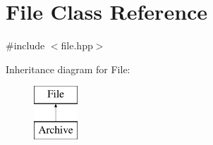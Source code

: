 \hypertarget{class_file}{\section{File Class Reference}
\label{class_file}
}


{\ttfamily \#include $<$file.\-hpp$>$}

Inheritance diagram for File\-:\begin{figure}[H]
\begin{center}
\leavevmode
\includegraphics[height=2.000000cm]{class_file}
\end{center}
\end{figure}
